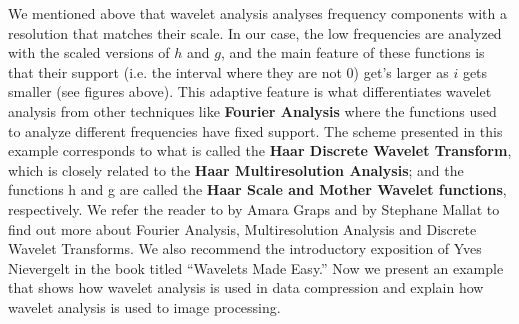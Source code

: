 We mentioned above that wavelet analysis analyses frequency components with a resolution that matches their scale. In our case, the low frequencies are analyzed with the scaled versions of $h$ and $g$, and the main feature of these functions is that their support (i.e. the interval where they are not 0) get's larger as $i$ gets smaller (see figures above). This adaptive feature is what differentiates wavelet analysis from other techniques like \textbf{Fourier Analysis} where the functions used to analyze different frequencies have fixed support. The scheme presented in this example corresponds to what is called the \textbf{Haar Discrete Wavelet Transform}, which is closely related to the \textbf{Haar Multiresolution Analysis}; and the functions h and g are called the \textbf{Haar Scale and Mother Wavelet functions}, respectively. We refer the reader to  by Amara Graps and  by Stephane Mallat to find out more about Fourier Analysis, Multiresolution Analysis and Discrete Wavelet Transforms. We also recommend the introductory exposition of Yves Nievergelt in the book titled ``Wavelets Made Easy.'' Now we present an example that shows how wavelet analysis is used in data compression and explain how wavelet analysis is used to image processing.






